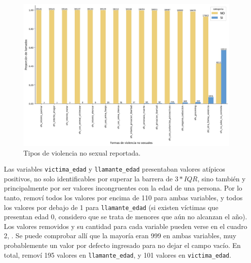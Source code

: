 \documentclass[10 pt]{article}
\begin{document}
\begin{figure}[H]
\begin{center}
\includegraphics[scale=.4]{images/latex_ofv_sino.jpeg}
\caption{Tipos de violencia no sexual reportada.}
\label{ofvsino}
\end{center}
\end{figure} 



Las variables \texttt{victima\_edad} y \texttt{llamante\_edad} presentaban valores atípicos positivos, no solo identificables por superar la barrera de \(3*IQR\), sino también y principalmente por ser valores incongruentes con la edad de una persona. Por lo tanto, removí todos los valores por encima de 110 para ambas variables, y todos los valores por debajo de 1 para \texttt{llamante\_edad} (si existen víctimas que presentan edad 0, considero que se trata de menores que aún no alcanzan el año). Los valores removidos y su cantidad para cada variable pueden verse en el cuadro 2, . Se puede comprobar allí que la mayoría eran 999 en ambas variables, muy probablemente un valor por defecto ingresado para no dejar el campo vacío. En total, removí 195 valores en \texttt{llamante\_edad}, y 101 valores en \texttt{victima\_edad}. 
\end{document}
